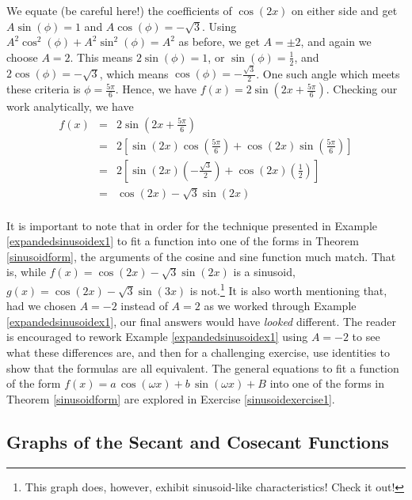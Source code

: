 {\begin{enumerate}
We equate (be careful here!) the coefficients of $\cos(2x)$ on either side and get $A\sin(\phi) = 1$ and $A\cos(\phi) = -\sqrt{3}$.  Using $A^2\cos^{2}(\phi) + A^2\sin^{2}(\phi) = A^2$ as before, we get $A = \pm 2$, and again we choose $A = 2$.  This means $2 \sin(\phi) = 1$, or $\sin(\phi) = \frac{1}{2}$,  and $2\cos(\phi) = -\sqrt{3}$, which means $\cos(\phi) = -\frac{\sqrt{3}}{2}$.  One such angle which meets these criteria   is $\phi = \frac{5\pi}{6}$.  Hence, we have $f(x) = 2 \sin\left(2x + \frac{5\pi}{6}\right)$.  Checking our work analytically, we have \[\begin{array}{rcl} f(x) &  = &  2 \sin\left(2x + \frac{5\pi}{6}\right) \\ [3pt] & = &  2 \left[ \sin(2x) \cos\left(\frac{5\pi}{6}\right) + \cos(2x) \sin\left(\frac{5\pi}{6}\right) \right]\\ [3pt] & = & 2 \left[ \sin(2x) \left(-\frac{\sqrt{3}}{2}\right) +  \cos(2x) \left(\frac{1}{2}\right)\right] \\ [3pt] & = & \cos(2x) - \sqrt{3} \sin(2x) \\ \end{array}\]
\end{enumerate}
}

\medskip

It is important to note that in order for the technique presented in Example \ref{expandedsinusoidex1} to fit a function into one of the forms in Theorem \ref{sinusoidform},  the arguments of the cosine and sine function much match.  That is, while $f(x) = \cos(2x) - \sqrt{3} \sin(2x)$ is a sinusoid, $g(x) =  \cos(2x) - \sqrt{3} \sin(3x)$ is not.\footnote{This graph does, however, exhibit sinusoid-like characteristics!  Check it out!}  It is also worth mentioning that, had we chosen  $A = -2$ instead of $A = 2$ as we worked through Example \ref{expandedsinusoidex1}, our final answers would have \textit{looked} different. The reader is encouraged to rework Example  \ref{expandedsinusoidex1} using $A = -2$ to see what these differences are, and then for a challenging exercise, use identities to show that the formulas are all equivalent.  The general equations to fit a function of the form $f(x) = a \, \cos(\omega x) + b \, \sin(\omega x) + B$ into one of the forms in Theorem \ref{sinusoidform} are explored in Exercise \ref{sinusoidexercise1}.

\subsection{Graphs of the Secant and Cosecant Functions}
\label{secantcosecantgraphsection}


